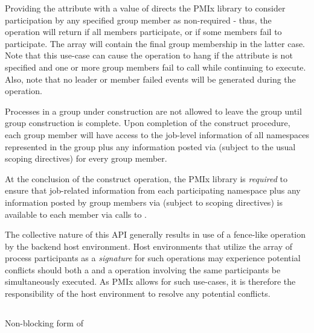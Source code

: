 Providing the  attribute with a value of  directs the \ac{PMIx} library to consider participation by any specified group member as non-required - thus, the operation will return  if all members participate, or  if some members fail to participate. The  array will contain the final group membership in the latter case. Note that this use-case can cause the operation to hang if the  attribute is not specified and one or more group members fail to call  while continuing to execute. Also, note that no leader or member failed events will be generated during the operation.

Processes in a group under construction are not allowed to leave the group until group construction is complete. Upon completion of the construct procedure, each group member will have access to the job-level information of all namespaces represented in the group plus any information posted via  (subject to the usual scoping directives) for every group member.

\adviceimplstart
At the conclusion of the construct operation, the \ac{PMIx} library is \emph{required} to ensure that job-related information from each participating namespace plus any information posted by group members via  (subject to scoping directives) is available to each member via calls to .
\adviceimplend

\advicermstart
The collective nature of this \ac{API} generally results in use of a fence-like operation by the backend host environment. Host environments that utilize the array of process participants as a \emph{signature} for such operations may experience potential conflicts should both a  and a  operation involving the same participants be simultaneously executed. As \ac{PMIx} allows for such use-cases, it is therefore the responsibility of the host environment to resolve any potential conflicts.
\advicermend

\subsection{}

\summary

Non-blocking form of 

